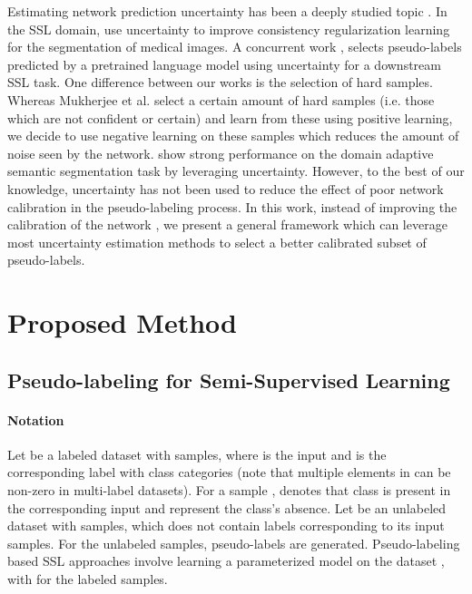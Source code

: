 \documentclass{article} \usepackage{iclr2021_conference,times}
\begin{document}
Estimating network prediction uncertainty has been a deeply studied topic \citep{NIPS2011_4329, 10.5555/3045118.3045290, pmlr-v48-louizos16, NIPS2017_7219, malinin2018predictive, maddox2019simple, welling2011bayesian}. In the SSL domain, \citep{yu2019uncertainty, xia20203d} use uncertainty to improve consistency regularization learning for the segmentation of medical images. A concurrent work \citep{mukherjee2020uncertainty}, selects pseudo-labels predicted by a pretrained language model using uncertainty for a downstream SSL task. One difference between our works is the selection of hard samples. Whereas Mukherjee et al. select a certain amount of hard samples (i.e. those which are not confident or certain) and learn from these using positive learning, we decide to use negative learning on these samples which reduces the amount of noise seen by the network. \cite{zheng2020rectifying} show strong performance on the domain adaptive semantic segmentation task by leveraging uncertainty. However, to the best of our knowledge, uncertainty has not been used to reduce the effect of poor network calibration in the pseudo-labeling process. In this work, instead of improving the calibration of the network \citep{pmlr-v70-guo17a, Xing2020Distance-Based}, we present a general framework which can leverage most uncertainty estimation methods to select a better calibrated subset of pseudo-labels. 












\section{Proposed Method}

\subsection{Pseudo-labeling for Semi-Supervised Learning}
\paragraph{Notation} 
Let  be a labeled dataset with  samples, where  is the input and  is the corresponding label with  class categories (note that multiple elements in  can be non-zero in multi-label datasets). For a sample ,  denotes that class  is present in the corresponding input and  represent the class's absence. Let  be an unlabeled dataset with  samples, which does not contain labels corresponding to its input samples. For the unlabeled samples, pseudo-labels  are generated. Pseudo-labeling based SSL approaches involve learning a parameterized model  on the dataset , with  for the  labeled samples. 
\end{document}
